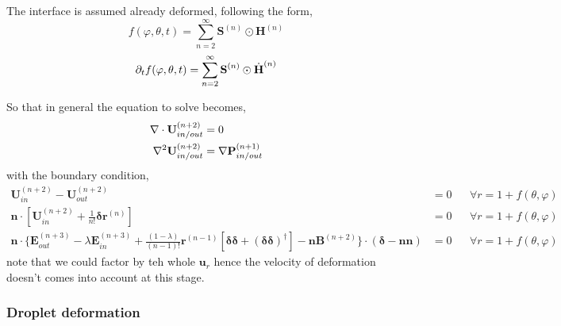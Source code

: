 The interface is assumed already deformed, following the form, 
\begin{equation}
    f(\varphi,\theta,t) =  \sum_{n=2}^{\infty} \textbf{S}^{(n)}\odot \textbf{H}^{(n)}
\end{equation}
\begin{equation}
   \partial_t  f(\varphi,\theta,t) =  \sum_{n=2}^{\infty} \textbf{S}^{(n)}\odot \dot{\textbf{H}}^{(n)}
\end{equation}

So that in general the equation to solve becomes, 
\begin{align*}
    \mathbf{\nabla}\cdot \textbf{U}_{in/out}^{(n+2)} &= 0 \\
    \mathbf{\nabla}^2\textbf{U}_{in/out}^{(n+2)} &= \mathbf{\nabla} \textbf{P}_{in/out}^{(n+1)} \\
\end{align*}
with the boundary condition, 
\begin{align}
    \textbf{U}_{in}^{(n+2)} - \textbf{U}_{out}^{(n+2)}
    &=
    0
    &&\forall r = 1 + f(\theta,\varphi)
    \\
    \textbf{n}\cdot [\textbf{U}_{in}^{(n+2)} 
    +\frac{1}{n!}\bm\delta \textbf{r}^{(n)}] &= 0 
    &&\forall r = 1 + f(\theta,\varphi)\\
    \textbf{n}\cdot \{
        \textbf{E}_{out}^{(n+3)}
        -\lambda\textbf{E}_{in}^{(n+3)}
        +\frac{(1-\lambda)}{(n-1)!}
        \textbf{r}^{(n-1)}[\bm\delta\bm\delta + (\bm\delta\bm\delta)^\dagger]
        - \textbf{n}\textbf{B}^{(n+2)}
    \}\cdot (\bm\delta - \textbf{nn})
    &=
    0
    &&\forall r = 1 + f(\theta,\varphi)
\end{align}
note that we could factor by teh whole $\textbf{u}_r$ hence the velocity of deformation doesn't comes into account at this stage. 

\subsubsection*{Droplet deformation }

